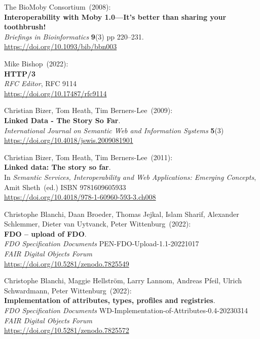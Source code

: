 \begin{thebibliography}{9}
The BioMoby Consortium~(2008): \\
\textbf{Interoperability with Moby 1.0---It's better than sharing your
toothbrush!}\\
\emph{Briefings in Bioinformatics} \textbf{9}(3) pp
220--231.\\
\url{https://doi.org/10.1093/bib/bbn003}

Mike Bishop~(2022): \\
\textbf{{HTTP}/3}\\
\emph{RFC Editor}, RFC 9114 \\
\url{https://doi.org/10.17487/rfc9114}

Christian Bizer, Tom Heath, Tim Berners-Lee~(2009): \\
\textbf{Linked Data - The Story So Far}.\\
\emph{International Journal on Semantic Web and Information Systems}
\textbf{5}(3)\\
\url{https://doi.org/10.4018/jswis.2009081901}

Christian Bizer, Tom Heath, Tim Berners-Lee~(2011): \\
\textbf{Linked data: The story so far}.\\
In \emph{Semantic Services, Interoperability and Web Applications:
Emerging Concepts}, Amit Sheth~(ed.) ISBN 9781609605933\\
\url{https://doi.org/10.4018/978-1-60960-593-3.ch008}

Christophe Blanchi, Daan Broeder, Thomas Jejkal, Islam Sharif, Alexander
Schlemmer, Dieter van Uytvanck, Peter Wittenburg~(2022): \\
\textbf{FDO -- upload of FDO}.\\
\emph{FDO Specification Documents} PEN-FDO-Upload-1.1-20221017 \\
\emph{FAIR Digital Objects Forum}\\
\url{https://doi.org/10.5281/zenodo.7825549}

Christophe Blanchi, Maggie Hellström, Larry Lannom, Andreas Pfeil, Ulrich Schwardmann, Peter Wittenburg~(2022): \\
\textbf{Implementation of
attributes, types, profiles and registries}. \\
\emph{FDO Specification Documents} WD-Implementation-of-Attributes-0.4-20230314 \\
\emph{FAIR Digital Objects Forum}\\
\url{https://doi.org/10.5281/zenodo.7825572}


\end{thebibliography}

